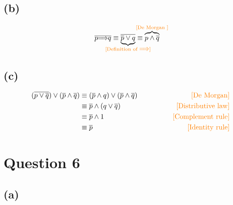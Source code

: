 \documentclass[12pt]{article}
\theoremstyle{definition}
\theoremstyle{definition}
\theoremstyle{definition}
\theoremstyle{definition}
\theoremstyle{definition}
\theoremstyle{example}
\theoremstyle{note}
\theoremstyle{remark}
\let\oldimplies\implies
\renewcommand*{\implies}{
	\hspace{-0.05cm}\resizebox{.95\width}{\height}{$\oldimplies$}\hspace{-0.05cm}
}
\begin{document}
			\subsection*{(b) }	
				\begin{align*}
					\overline{p \implies q} &\equiv \underbrace{\overline{\overline{p} \lor q}}_{\mathclap{\textcolor{orange}{[\text{Definition of }\implies ]}}} \equiv\overbrace{ p \land \overline{q}}^{\mathclap{\textcolor{orange}{[\text{De Morgan }]}}}
				\end{align*}
			\subsection*{(c) }		
				\begin{align*}
					(\overline{p \lor \overline{q}}) \lor (\overline{p} \land \overline{q}) &\equiv (\overline{p} \land q) \lor (\overline{p} \land \overline{q}) \qquad\qquad&\textcolor{orange}{[\text{De Morgan}]} \\
					&\equiv \overline{p} \land (q \lor \overline{q})  &\textcolor{orange}{[\text{Distributive law}]} \\
					&\equiv \overline{p} \land 1 &\textcolor{orange}{[\text{Complement rule}]} \\
					&\equiv \overline{p} &\textcolor{orange}{[\text{Identity rule}]}
				\end{align*}
		\section*{Question 6}
			\subsection*{(a) }	
			
			\begin{center}
			\end{center}
		
\end{document}

